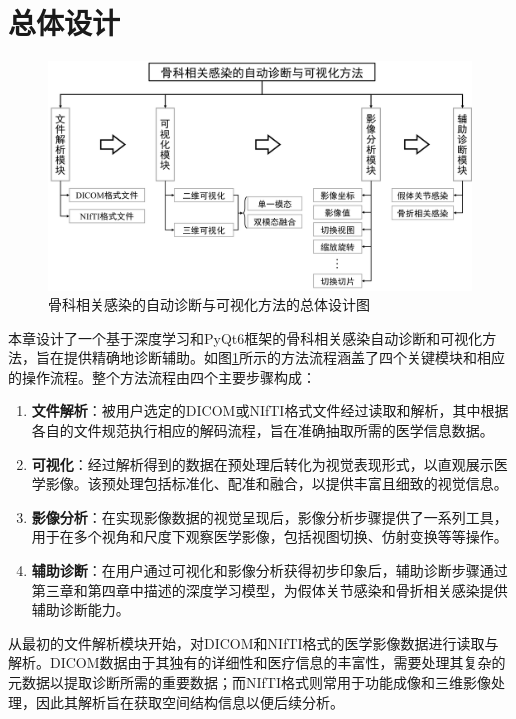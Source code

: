 \section{总体设计}

\begin{figure}[h]
    \centering
    \includegraphics[width=\textwidth]{figures/chap05_overall.png}
    \caption{骨科相关感染的自动诊断与可视化方法的总体设计图}
    \label{fig:chap05_overall}
\end{figure}

本章设计了一个基于深度学习和PyQt6框架的骨科相关感染自动诊断和可视化方法，旨在提供精确地诊断辅助。如图\ref{fig:chap05_overall}所示的方法流程涵盖了四个关键模块和相应的操作流程。整个方法流程由四个主要步骤构成：
\begin{enumerate}
    \item \textbf{文件解析}：被用户选定的DICOM或NIfTI格式文件经过读取和解析，其中根据各自的文件规范执行相应的解码流程，旨在准确抽取所需的医学信息数据。
    \item \textbf{可视化}：经过解析得到的数据在预处理后转化为视觉表现形式，以直观展示医学影像。该预处理包括标准化、配准和融合，以提供丰富且细致的视觉信息。
    \item \textbf{影像分析}：在实现影像数据的视觉呈现后，影像分析步骤提供了一系列工具，用于在多个视角和尺度下观察医学影像，包括视图切换、仿射变换等等操作。
    \item \textbf{辅助诊断}：在用户通过可视化和影像分析获得初步印象后，辅助诊断步骤通过第三章和第四章中描述的深度学习模型，为假体关节感染和骨折相关感染提供辅助诊断能力。
\end{enumerate}

从最初的文件解析模块开始，对DICOM和NIfTI格式的医学影像数据进行读取与解析。DICOM数据由于其独有的详细性和医疗信息的丰富性，需要处理其复杂的元数据以提取诊断所需的重要数据；而NIfTI格式则常用于功能成像和三维影像处理，因此其解析旨在获取空间结构信息以便后续分析。


